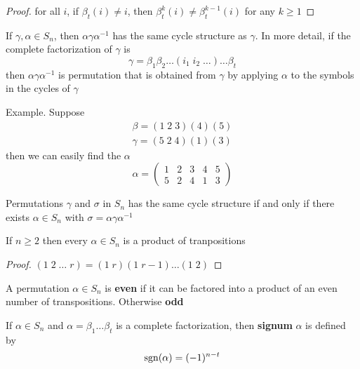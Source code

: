 \documentclass[11pt]{article}
\begin{document}
\begin{proof}
for all \(i\), if \(\beta_t(i)\neq i\), then \(\beta_t^k(i)\neq\beta_t^{k-1}(i)\)
for any \(k\ge 1\)
\end{proof}

\begin{lemma}[]
If \(\gamma,\alpha\in S_n\), then \(\alpha\gamma\alpha^{-1}\) has the same cycle
structure as \(\gamma\). In more detail, if the complete factorization of
\(\gamma\) is
\begin{equation*}
\gamma=\beta_1\beta_2\dots(i_1\; i_2\;\dots)\dots\beta_t
\end{equation*}
then \(\alpha\gamma\alpha^{-1}\) is permutation that is obtained from \(\gamma\)
by applying \(\alpha\) to the symbols in the cycles of \(\gamma\)
\end{lemma}

Example. Suppose
\begin{gather*}
\beta=(1\;2\;3)(4)(5)\\
\gamma=(5\;2\;4)(1)(3)
\end{gather*}
then we can easily find the \(\alpha\)
\begin{equation*}
\alpha=
\begin{pmatrix}
1&2&3&4&5\\
5&2&4&1&3
\end{pmatrix}
\end{equation*}
\begin{theorem}[]
Permutations \(\gamma\) and \(\sigma\) in \(S_n\) has the same cycle structure if
and only if there exists \(\alpha\in S_n\) with \(\sigma=\alpha\gamma\alpha^{-1}\)
\end{theorem}


\begin{proposition}[]
If \(n\ge 2\) then every \(\alpha\in S_n\) is a product of tranpositions
\end{proposition}
\begin{proof}
\((1\;2\;\dots\; r)=(1\; r)(1\; r-1)\dots(1\; 2)\)
\end{proof}


\begin{definition}[]
A permutation \(\alpha\in S_n\) is \textbf{even} if it can be factored into a
product of an even number of transpositions. Otherwise \textbf{odd}
\end{definition}

\begin{definition}[]
If \(\alpha\in S_n\) and \(\alpha=\beta_1\dots\beta_t\) is a complete
factorization, then \textbf{signum} \(\alpha\) is defined by
\begin{equation*}
\operatorname{sgn}(\alpha)=(-1)^{n-t}
\end{equation*}
\end{definition}
\end{document}
